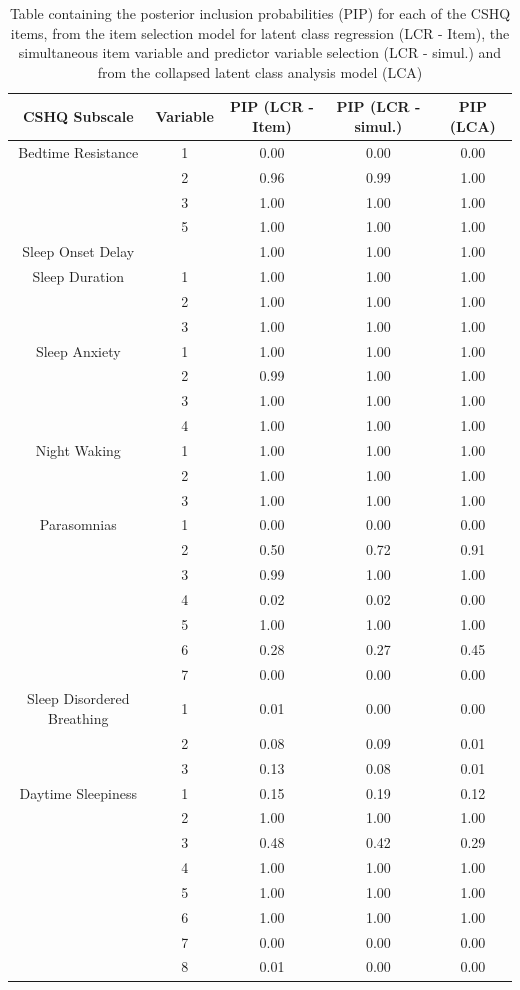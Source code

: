 \documentclass[11pt]{article}
\theoremstyle{plain}
\theoremstyle{definition}
\begin{document}
\begin{table}[H]
\centering
\begin{tabular}{ccccc}
\hline
CSHQ Subscale & Variable & PIP (LCR - Item) & PIP (LCR - simul.) & PIP (LCA) \\
\hline
Bedtime Resistance & 1 & 0.00 & 0.00 & 0.00   \\
&2 &  0.96 & 0.99 &  1.00  \\
&3 &  1.00 & 1.00 &  1.00  \\
&5 &  1.00 & 1.00 &  1.00  \\
\hline
Sleep Onset Delay & & 1.00 & 1.00 &  1.00    \\
\hline
Sleep Duration &1 & 1.00 & 1.00 &  1.00  \\
& 2 & 1.00 & 1.00 & 1.00 \\
&3 & 1.00 & 1.00 & 1.00  \\
\hline
Sleep Anxiety&1 & 1.00 & 1.00 & 1.00   \\
&2 & 0.99 & 1.00 &  1.00 \\
&3 & 1.00 & 1.00 & 1.00  \\
&4 & 1.00 & 1.00 & 1.00  \\
\hline
Night Waking&1 & 1.00 & 1.00 & 1.00   \\
&2 & 1.00 & 1.00 &  1.00  \\
&3 & 1.00 & 1.00 &  1.00  \\
\hline
Parasomnias&1 & 0.00 & 0.00 &  0.00  \\
&2 & 0.50 & 0.72 &  0.91  \\
&3 & 0.99 & 1.00 & 1.00   \\
&4 & 0.02 & 0.02 &  0.00  \\
&5 & 1.00 & 1.00 &  1.00  \\
&6 & 0.28 & 0.27 &  0.45  \\
&7 & 0.00 & 0.00 &  0.00  \\
\hline
Sleep Disordered Breathing&1 & 0.01 & 0.00 &  0.00  \\
&2 & 0.08 & 0.09 & 0.01  \\
&3 & 0.13 & 0.08 &  0.01  \\
\hline
Daytime Sleepiness&1 & 0.15 & 0.19 & 0.12   \\
&2 & 1.00 & 1.00 &  1.00  \\
&3 & 0.48 & 0.42 &  0.29  \\
&4 & 1.00 & 1.00 &  1.00  \\
&5 & 1.00 & 1.00 &  1.00  \\
&6 & 1.00 & 1.00 &  1.00  \\
&7 & 0.00 & 0.00 &  0.00  \\
&8 & 0.01 & 0.00 &  0.00  \\
\hline
\end{tabular}
\caption{Table containing the posterior inclusion probabilities (PIP) for each of the CSHQ items, from the item selection model for latent class regression (LCR - Item), the simultaneous item variable and predictor variable selection (LCR - simul.) and from the collapsed latent class analysis model (LCA)}\label{table:item_selection_results_CSHQ}
\end{table}
\end{document}
